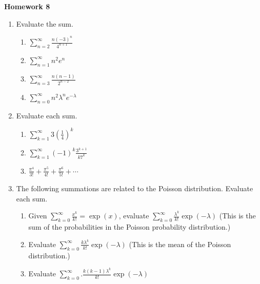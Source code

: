\documentclass{article}
\begin{document}
\begin{center}
    \large \textbf{Homework 8}
\end{center}
                \begin{enumerate}
                    \item Evaluate the sum.
                        \begin{enumerate}
                            \item $\displaystyle \sum_{n=2}^\infty \frac{n(-3)^n}{4^{n+1}}$
                            \item $\displaystyle \sum_{n=1}^\infty {n^2e^n}$
                            \item $\displaystyle \sum_{n=3}^\infty \frac{n(n-1)}{2^{n-2}}$
                            \item $\displaystyle \sum_{n=0}^\infty n^2\lambda^n e^{-\lambda}$ 
                        \end{enumerate}
                    \item Evaluate each sum.
                        \begin{enumerate}
                            \item $\displaystyle \sum_{k=1}^\infty 3\left(\frac{1}{4}\right)^k$
                            \item $\displaystyle \sum_{k=1}^\infty (-1)^{k}\frac{3^{k+1}}{k7^k}$
                            \item $\displaystyle \frac{\pi^4}{3!}+\frac{\pi^5}{4!}+\frac{\pi^6}{5!}+\cdots$
                        \end{enumerate}
                    \item The following summations are related to the Poisson distribution.  Evaluate each sum.
                        \begin{enumerate}
                            \item Given $\displaystyle \sum_{k=0}^\infty \frac{x^k}{k!}=\exp(x)$, evaluate $\displaystyle\sum_{k=0}^\infty \frac{\lambda^k}{k!}\exp(-\lambda)$  (This is the sum of the probabilities in the Poisson probability distribution.)
                            \item Evaluate $\displaystyle \sum_{k=0}^\infty \frac{k\lambda^k}{k!}\exp(-\lambda)$ (This is the mean of the Poisson distribution.)
                            \item Evaluate $\displaystyle \sum_{k=0}^\infty. \frac{k(k-1)\lambda^k}{k!}\exp(-\lambda)$

\end{enumerate}
\end{enumerate}
\end{document}
